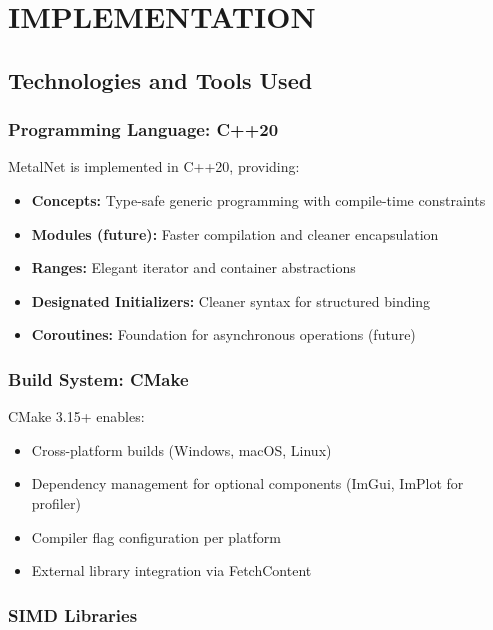 \documentclass[12pt,oneside,a4paper]{report}
\begin{document}
\newpage

\chapter{IMPLEMENTATION}

\section{Technologies and Tools Used}

\subsection{Programming Language: C++20}

MetalNet is implemented in C++20, providing:
\begin{itemize}
    \item \textbf{Concepts:} Type-safe generic programming with compile-time constraints
    \item \textbf{Modules (future):} Faster compilation and cleaner encapsulation
    \item \textbf{Ranges:} Elegant iterator and container abstractions
    \item \textbf{Designated Initializers:} Cleaner syntax for structured binding
    \item \textbf{Coroutines:} Foundation for asynchronous operations (future)
\end{itemize}

\subsection{Build System: CMake}

CMake 3.15+ enables:
\begin{itemize}
    \item Cross-platform builds (Windows, macOS, Linux)
    \item Dependency management for optional components (ImGui, ImPlot for profiler)
    \item Compiler flag configuration per platform
    \item External library integration via FetchContent
\end{itemize}

\subsection{SIMD Libraries}
\end{document}
